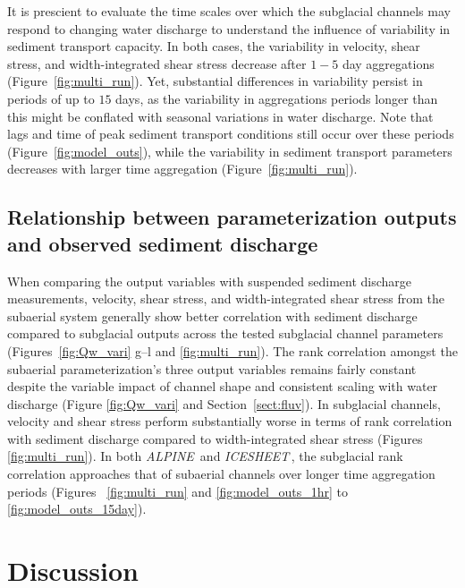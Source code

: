 \documentclass[draft]{agujournal2019}
\newcommand{\alpine}{\textit{ALPINE}\,}
\newcommand{\icesheet}{\textit{ICESHEET}\,}
\begin{document}
It is prescient to evaluate the time scales over which the subglacial channels may respond to changing water discharge to understand the influence of variability in sediment transport capacity.
In both cases, the variability in velocity, shear stress, and width-integrated shear stress decrease after $1-5$ day aggregations (Figure~\ref{fig:multi_run}).
Yet, substantial differences in variability persist in periods of up to $15$ days, as the variability in aggregations periods longer than this might be conflated with seasonal variations in water discharge.
Note that lags and time of peak sediment transport conditions still occur over these periods (Figure~\ref{fig:model_outs}), while the variability in sediment transport parameters decreases with larger time aggregation (Figure~\ref{fig:multi_run}).

\subsection{Relationship between parameterization  outputs and observed sediment discharge}
When comparing the output variables with suspended sediment discharge measurements, velocity, shear stress, and width-integrated shear stress from the subaerial system generally show better correlation with sediment discharge compared to subglacial outputs across the tested subglacial channel parameters (Figures~\ref{fig:Qw_vari} g--l and \ref{fig:multi_run}).
The rank correlation amongst the  subaerial parameterization's three output variables remains fairly constant despite the variable impact of channel shape and consistent scaling with water discharge (Figure \ref{fig:Qw_vari} and Section~\ref{sect:fluv}).
In subglacial channels, velocity and shear stress perform substantially worse in terms of rank correlation with sediment discharge compared to width-integrated shear stress (Figures~ \ref{fig:multi_run}).
In both \alpine{} and \icesheet{}, the  subglacial rank correlation approaches that of subaerial channels over longer time aggregation periods (Figures~ \ref{fig:multi_run} and \ref{fig:model_outs_1hr} to \ref{fig:model_outs_15day}).


\section{Discussion}
\end{document}
